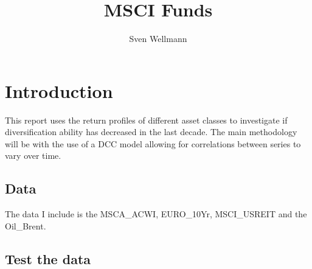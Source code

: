 \documentclass[11pt,preprint, authoryear]{elsarticle}
\numberwithin{equation}{section}
\numberwithin{figure}{section}
\numberwithin{table}{section}
\begin{document}
\begin{frontmatter}  %

\title{MSCI Funds}





\author[Add1]{Sven Wellmann}





\address[Add1]{Stellenbosch University, Stellenbosch, South Africa}



\vspace{1cm}





\vspace{0.5cm}

\end{frontmatter}



\pagestyle{fancy}
\chead{}
\rhead{}
\lfoot{}
\lhead{}
\cfoot{}


\headsep 35pt %




\hypertarget{introduction}{%
\section{\texorpdfstring{Introduction
\label{Introduction}}{Introduction }}\label{introduction}}

This report uses the return profiles of different asset classes to
investigate if diversification ability has decreased in the last decade.
The main methodology will be with the use of a DCC model allowing for
correlations between series to vary over time.

\hypertarget{data}{%
\subsection{Data}\label{data}}

The data I include is the MSCA\_ACWI, EURO\_10Yr, MSCI\_USREIT and the
Oil\_Brent.

\hypertarget{test-the-data}{%
\subsection{Test the data}\label{test-the-data}}
\end{document}
